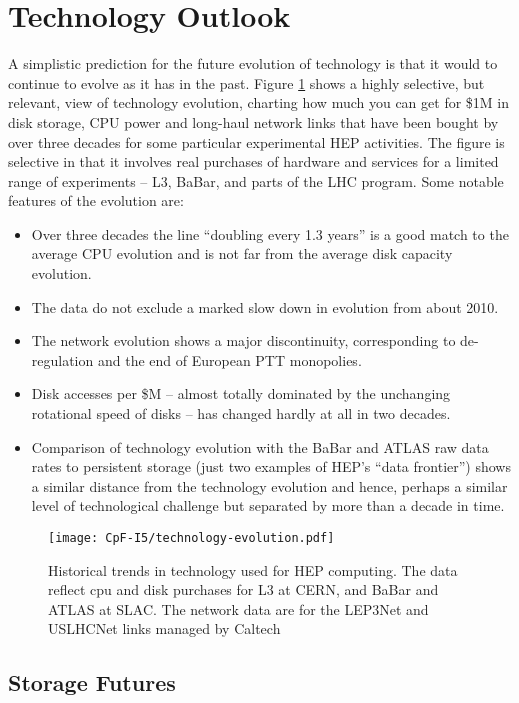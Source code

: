 \section{Technology Outlook}
\label{sec:cpfi5-technology}
A simplistic prediction for the future evolution of technology is that it 
would to continue to 
evolve as it has in the past.  Figure \ref{fig:technology-evolution} shows a highly selective, but relevant, 
view of technology evolution, charting how much you can get for \$1M in disk storage, 
CPU power and long-haul network links that have been bought by over three decades 
for some particular experimental HEP activities.  The figure is  selective in that 
it involves real purchases of hardware and services for a limited range of 
experiments -- L3, BaBar, and parts of the LHC program. Some notable features of the 
evolution are:
\begin{itemize}
\item
Over three decades the line ``doubling every 1.3 years'' is a good match to the average 
CPU evolution and is not far from the average disk capacity evolution.
\item
The data do not exclude a marked slow down in evolution from about 2010.
\item
The network evolution shows a major discontinuity, corresponding to de-regulation 
and the end of European PTT monopolies.
\item
Disk accesses per \$M -- almost totally dominated by the unchanging rotational 
speed of disks -- has changed hardly at all in two decades.
\item
Comparison of technology evolution with the BaBar and ATLAS raw data rates to 
persistent storage (just two examples of HEP’s ``data frontier'') shows a similar 
distance from the technology evolution and hence, perhaps a similar level of 
technological challenge but separated by more than a decade in time. 
\end{itemize}

\begin{figure}[h]
\centering
\texttt{[image: CpF-I5/technology-evolution.pdf]}
\caption{Historical trends in technology used for HEP computing.  The data reflect cpu and disk purchases for L3 at CERN, and BaBar and ATLAS at SLAC.  The network data are for the LEP3Net and USLHCNet links managed by Caltech}
\label{fig:technology-evolution}
\end{figure}


\subsection{Storage Futures}
